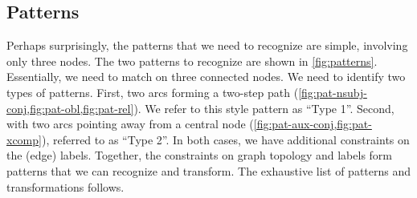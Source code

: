 \documentclass[11pt,a4paper]{article}
\begin{document}
\subsection{Patterns}

Perhaps surprisingly, the patterns that we need to recognize are
simple, involving only three nodes. The two patterns to recognize
are shown in \cref{fig:patterns}. Essentially, we need to match
on three connected nodes.  We need to identify two types of
patterns. First, two arcs forming a two-step path
(\cref{fig:pat-nsubj-conj,fig:pat-obl,fig:pat-rel}). We refer to
this style pattern as ``Type 1''.  Second, with two arcs pointing
away from a central node (\cref{fig:pat-aux-conj,fig:pat-xcomp}),
referred to as ``Type 2''.  In both cases, we have additional
constraints on the (edge) labels. Together, the constraints on
graph topology and labels form patterns that we can recognize
and transform.  The exhaustive list of patterns and
transformations follows.
\end{document}
